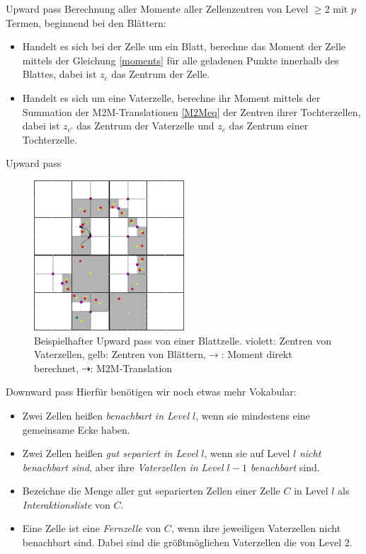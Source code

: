 \documentclass[ngerman]{beamer}
\begin{document}
\begin{frame}{Upward pass}
Berechnung aller Momente aller Zellenzentren von Level $\geq 2$ mit $p$ Termen, beginnend bei den Blättern:
\begin{itemize}
\item Handelt es sich bei der Zelle um ein Blatt, berechne das Moment der Zelle mittels der Gleichung \eqref{moments} für alle geladenen Punkte innerhalb des Blattes, dabei ist $z_c$ das Zentrum der Zelle.
\item Handelt es sich um eine Vaterzelle, berechne ihr Moment mittels der Summation der M2M-Translationen \eqref{M2Meq} der Zentren ihrer Tochterzellen, dabei ist $z_{c'}$ das Zentrum der Vaterzelle und $z_c$ das Zentrum einer Tochterzelle.
\end{itemize}
\end{frame}

\begin{frame}{Upward pass}
\begin{figure}
\includegraphics[width=0.5\textwidth]{upward.png}
\caption{Beispielhafter Upward pass von einer Blattzelle. \linebreak violett: Zentren von Vaterzellen, gelb: Zentren von Blättern,\linebreak $\rightarrow$: Moment direkt berechnet, $\dashrightarrow$: M2M-Translation}
\end{figure}
\end{frame}

\begin{frame}{Downward pass}
Hierfür benötigen wir noch etwas mehr Vokabular:
\begin{Definition}
\begin{itemize}
\item Zwei Zellen heißen \emph{benachbart in Level $l$}, wenn sie mindestens eine gemeinsame Ecke haben.
\item Zwei Zellen heißen \emph{gut separiert in Level $l$}, wenn sie auf Level $l$ \emph{nicht benachbart sind}, aber ihre \emph{Vaterzellen in Level $l-1$ benachbart} sind.
\item Bezeichne die Menge aller gut separierten Zellen einer Zelle $C$ in Level $l$ als \emph{Interaktionsliste} von $C$.
\item Eine Zelle ist eine \emph{Fernzelle} von $C$, wenn ihre jeweiligen Vaterzellen nicht benachbart sind. Dabei sind die größtmöglichen Vaterzellen die von Level $2$.
\end{itemize}
\end{Definition}
\end{frame}
\end{document}
